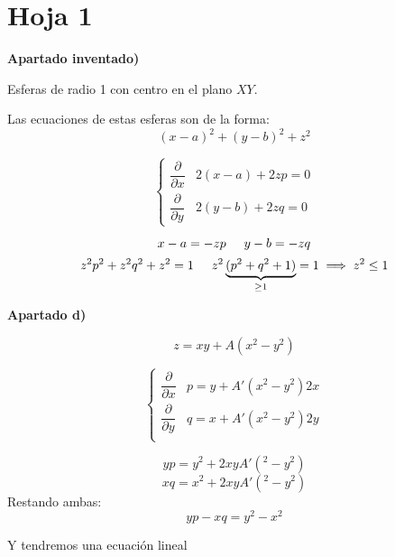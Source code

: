 \documentclass[openany]{book}
\begin{document}
\section{Hoja 1}
\setcounter{ex}{1}
\begin{exercise}

  \begin{flushright}
    \textbf{Apartado inventado)}
  \end{flushright}

  Esferas de radio 1 con centro en el plano $ XY $.

  Las ecuaciones de estas esferas son de la forma:
  $$ (x-a)^2+(y-b)^2+z^2 $$

  $$ \left\{
  \begin{array}{ll}
    \dfrac{\partial }{\partial x} & 2(x-a)+2zp = 0\\ 
    \dfrac{\partial }{\partial y} & 2(y-b) + 2zq = 0
  \end{array}
  \right. $$

  $$ x-a = -zp \hspace{5mm} y-b = -zq $$
  $$  z^2p^2+z^2q^2+z^2=1 \hspace{5mm} z^2\underbrace{(p^2+q^2+1)}_{\geq  1} = 1 \implies z^2 \leq  1$$

  \begin{flushright}
    \textbf{Apartado d)}
  \end{flushright}

  $$ z = xy+A(x^2-y^2) $$
  
  $$ \left\{
  \begin{array}{ll}
    \dfrac{\partial }{\partial x} & p = y+A'(x^2-y^2)2x\\ 
    \dfrac{\partial }{\partial y} & q = x + A'(x^2-y^2)2y\\ 
  \end{array}
  \right. $$

  $$ yp = y^2+2xyA'(^2-y^2) $$
  $$ xq = x^2+2xyA'(^2-y^2) $$
  Restando ambas:
  $$ yp - xq = y^2-x^2 $$

  Y tendremos una ecuación lineal

\end{exercise}

\setcounter{ex}{8}
\end{document}

